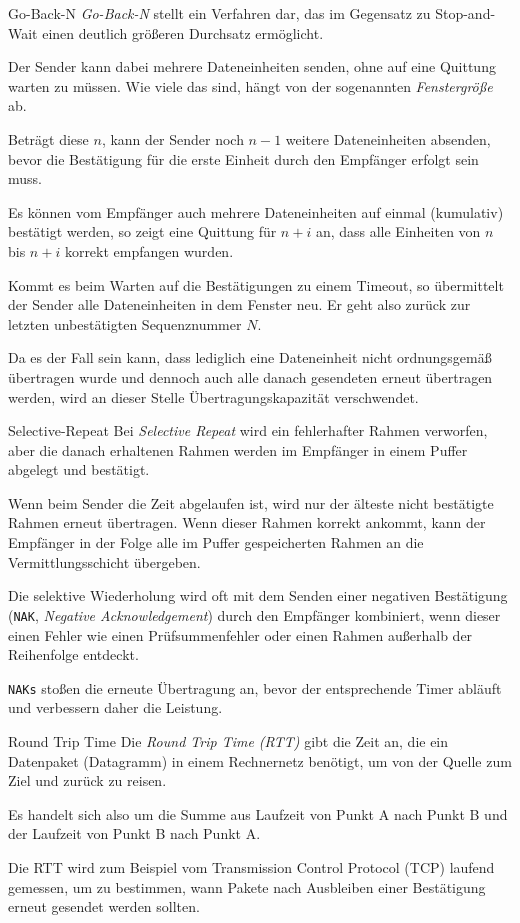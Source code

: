 \begin{bonus}{Go-Back-N}
    \emph{Go-Back-N} stellt ein Verfahren dar, das im Gegensatz zu Stop-and-Wait einen deutlich größeren Durchsatz ermöglicht.

    Der Sender kann dabei mehrere Dateneinheiten senden, ohne auf eine Quittung warten zu müssen.
    Wie viele das sind, hängt von der sogenannten \emph{Fenstergröße} ab.

    Beträgt diese $n$, kann der Sender noch $n-1$ weitere Dateneinheiten absenden, bevor die Bestätigung für die erste Einheit durch den Empfänger erfolgt sein muss.

    Es können vom Empfänger auch mehrere Dateneinheiten auf einmal (kumulativ) bestätigt werden, so zeigt eine Quittung für $n+i$ an, dass alle Einheiten von $n$ bis $n+i$ korrekt empfangen wurden.

    Kommt es beim Warten auf die Bestätigungen zu einem Timeout, so übermittelt der Sender alle Dateneinheiten in dem Fenster neu.
    Er geht also zurück zur letzten unbestätigten Sequenznummer $N$.

    Da es der Fall sein kann, dass lediglich eine Dateneinheit nicht ordnungsgemäß übertragen wurde und dennoch auch alle danach gesendeten erneut übertragen werden, wird an dieser Stelle Übertragungskapazität verschwendet.
\end{bonus}

\begin{bonus}{Selective-Repeat}
    Bei \emph{Selective Repeat}  wird ein fehlerhafter Rahmen verworfen, aber die danach erhaltenen Rahmen werden im Empfänger in einem Puffer abgelegt und bestätigt.

    Wenn beim Sender die Zeit abgelaufen ist, wird nur der älteste nicht bestätigte Rahmen erneut übertragen.
    Wenn dieser Rahmen korrekt ankommt, kann der Empfänger in der Folge alle im Puffer gespeicherten Rahmen an die Vermittlungsschicht übergeben.

    Die selektive Wiederholung wird oft mit dem Senden einer negativen Bestätigung (\texttt{NAK}, \emph{Negative Acknowledgement}) durch den Empfänger kombiniert, wenn dieser einen Fehler wie einen Prüfsummenfehler oder einen Rahmen außerhalb der Reihenfolge entdeckt.

    \texttt{NAKs} stoßen die erneute Übertragung an, bevor der entsprechende Timer abläuft und verbessern daher die Leistung.
\end{bonus}

\begin{defi}{Round Trip Time}
    Die \emph{Round Trip Time (RTT)} gibt die Zeit an, die ein Datenpaket (Datagramm) in einem Rechnernetz benötigt, um von der Quelle zum Ziel und zurück zu reisen.

    Es handelt sich also um die Summe aus Laufzeit von Punkt A nach Punkt B und der Laufzeit von Punkt B nach Punkt A.

    Die RTT wird zum Beispiel vom Transmission Control Protocol (TCP) laufend gemessen, um zu bestimmen, wann Pakete nach Ausbleiben einer Bestätigung erneut gesendet werden sollten.
\end{defi}

